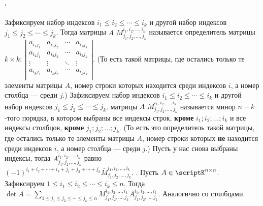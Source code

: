 \documentclass{article}
\begin{document}
    \paragraph{.}
    \begin{itemize}
        \dfn Зафиксируем набор индексов $i_1\leqslant i_2\leqslant\cdots\leqslant i_k$ и другой набор индексов $j_1\leqslant j_2\leqslant\cdots\leqslant j_k$. Тогда  матрицы $A$ $M_{j_1,j_2,\ldots,j_k}^{i_1,i_2,\ldots,i_k}$ называется определитель матрицы $k\times k$: $\left|\begin{matrix}
            a_{i_1j_1} & a_{i_1j_2} & \cdots & a_{i_1j_k}\\
            a_{i_2j_1} & a_{i_2j_2} & \cdots & a_{i_2j_k}\\
            \vdots & \vdots & \ddots & \vdots\\
            a_{i_kj_1} & a_{i_kj_2} & \cdots & a_{i_kj_k}\\
        \end{matrix}\right|$. (То есть такой матрицы, где остались только те элементы матрицы $A$, номер строки которых находится среди индексов $i$, а номер столбца --- среди $j$.)
        \dfn Зафиксируем набор индексов $i_1\leqslant i_2\leqslant\cdots\leqslant i_k$ и другой набор индексов $j_1\leqslant j_2\leqslant\cdots\leqslant j_k$.  матрицы $A$ $\overline M_{j_1,j_2,\ldots,j_k}^{i_1,i_2,\ldots,i_k}$ называется минор $n-k$-того порядка, в котором выбраны все индексы строк, \textbf{кроме} $i_1;i_2;\ldots;i_k$ и все индексы столбцов, \textbf{кроме} $j_1;j_2;\ldots;j_k$. (То есть это определитель такой матрицы, где остались только те элементы матрицы $A$, номер строки которых \textbf{не} находится среди индексов $i$, а номер столбца --- среди $j$.)
        \dfn Пусть у нас снова выбраны индексы, тогда  $A_{j_1,j_2,\ldots,j_k}^{i_1,i_2,\ldots,i_k}$ равно\\$(-1)^{i_1+i_2+\cdots+i_k+j_1+j_2+\cdots+j_k}\overline M_{j_1,j_2,\ldots,j_k}^{i_1,i_2,\ldots,i_k}$.
        \thm {}. Пусть $A\in\scriptK^{n\times n}$. Зафиксируем $1\leqslant i_1\leqslant i_2\leqslant\cdots\leqslant i_k\leqslant n$. Тогда $\det A=\sum\limits_{1\leqslant j_1\leqslant j_2\leqslant\cdots\leqslant j_k\leqslant n}M_{j_1,j_2,\ldots,j_k}^{i_1,i_2,\ldots,i_k}A_{j_1,j_2,\ldots,j_k}^{i_1,i_2,\ldots,i_k}$. Аналогично со столбцами.
        \begin{Proof}

\end{Proof}
\end{itemize}
\end{document}
